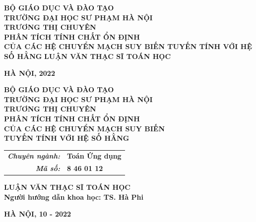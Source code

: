 \documentclass[12pt,a4paper]{report}
\theoremstyle{definition}
\theoremstyle{definition}
\numberwithin{dl}{chapter}
\numberwithin{vd}{chapter}
\numberwithin{corollary}{chapter}
\numberwithin{lemma}{chapter}
\numberwithin{md}{chapter}
\numberwithin{dn}{chapter}
\numberwithin{cy}{chapter}
\numberwithin{nx}{chapter}
\begin{document}
\fontsize{13pt}{18pt}\selectfont %

\setlength{\baselineskip}{17truept}

\begin{titlepage}
\begin{center}
{\large\bf BỘ GIÁO DỤC VÀ ĐÀO TẠO}\\
{\large\bf TRƯỜNG ĐẠI HỌC SƯ PHẠM HÀ NỘI}\\
\vskip 5cm
{\large\bf TRƯƠNG THỊ CHUYÊN}\\
\vskip 3cm
{\Large\bf PHÂN TÍCH TÍNH CHẤT ỔN ĐỊNH \\ CỦA CÁC HỆ CHUYỂN MẠCH SUY BIẾN TUYẾN TÍNH VỚI HỆ SỐ HẰNG}
\vskip 3.5cm
{\large\bf LUẬN VĂN THẠC SĨ TOÁN HỌC}
 
\vskip 3.25cm

{\large\bf HÀ NỘI, 2022}
\end{center}
\end{titlepage}
\setcounter{page}{2}
\large 
\begin{titlepage}
\begin{center}
{\large\bf BỘ GIÁO DỤC VÀ ĐÀO TẠO}\\
{\large\bf TRƯỜNG ĐẠI HỌC SƯ PHẠM HÀ NỘI}\\
\vskip 4cm
{\large\bf TRƯƠNG THỊ CHUYÊN}\\
\vskip 3cm
{\Large \bf PHÂN TÍCH TÍNH CHẤT ỔN ĐỊNH  \\ CỦA CÁC HỆ CHUYỂN MẠCH SUY BIẾN \\ TUYẾN TÍNH VỚI HỆ SỐ HẰNG}
\vskip 1cm

\begin{tabular}{r l}
\textit{\large\bf Chuyên ngành:}&{\large\bf Toán Ứng dụng}\\
\textit{\large\bf Mã số:}&\large\bf 8 46 01 12\\
\end{tabular}

\vskip 2cm
{\large\bf LUẬN VĂN THẠC SĨ TOÁN HỌC}\\
\vskip 1.5cm
{\large\bf Người hướng dẫn khoa học: TS. Hà Phi}\\
\vskip 1.2cm

 {\large\bf HÀ NỘI, 10 - 2022}\\
\end{center}
\end{titlepage}


\tableofcontents

\setlength{\baselineskip}{0.75cm}
\end{document}
